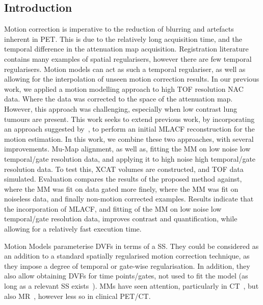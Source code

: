         \subsection{Introduction} \label{sec:pet_ct_motion_correction_exploiting_motion_models_fit_on_coarsely_gated_data_applied_to_finely_gated_data_introduction}
            Motion correction is imperative to the reduction of blurring and artefacts inherent in \gls{PET}. This is due to the relatively long acquisition time, and the temporal difference in the attenuation map acquisition. Registration literature contains many examples of spatial regularisers, however there are few temporal regularisers. Motion models can act as such a temporal regulariser, as well as allowing for the interpolation of unseen motion correction results. In our previous work, we applied a motion modelling approach to high \gls{TOF} resolution \gls{NAC} data. Where the data was corrected to the space of the attenuation map. However, this approach was challenging, especially when low contrast lung tumours are present. This work seeks to extend previous work, by incorporating an approach suggested by~\parencite{Lu2018RespiratoryData}, to perform an initial \gls{MLACF} reconstruction for the motion estimation. In this work, we combine these two approaches, with several improvements. \gls{Mu-Map} alignment, as well as, fitting the \gls{MM} on low noise low temporal/gate resolution data, and applying it to high noise high temporal/gate resolution data. To test this, \gls{XCAT} volumes are constructed, and \gls{TOF} data simulated. Evaluation compares the results of the proposed method against, where the \gls{MM} was fit on data gated more finely, where the \gls{MM} was fit on noiseless data, and finally non-motion corrected examples. Results indicate that the incorporation of \gls{MLACF}, and fitting of the \gls{MM} on low noise low temporal/gate resolution data, improves contrast and quantification, while allowing for a relatively fast execution time.
            
            Motion Models parameterise \glspl{DVF} in terms of a \gls{SS}. They could be considered as an addition to a standard spatially regularised motion correction technique, as they impose a degree of temporal or gate-wise regularisation. In addition, they also allow obtaining \glspl{DVF} for time points/gates, not used to fit the model (as long as a relevant \gls{SS} exists~\parencite{McClelland2013}). \glspl{MM} have seen attention, particularly in \gls{CT}~\parencite{Li2007EnhancedModel}, but also \gls{MR}~\parencite{Manke2002RespiratoryModels, Manber2016JointCorrection}, however less so in clinical \gls{PET}/\gls{CT}.
            
